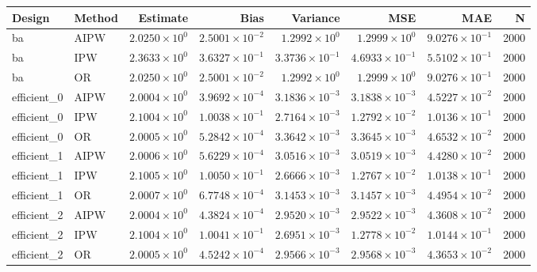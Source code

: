 \begin{table}[ht]
\centering
\begin{tabular}{llrrrrrr}
  \toprule
Design & Method & Estimate & Bias & Variance & MSE & MAE & N \\ 
  \midrule
ba & AIPW & $2.0250 \times 10^{0}$ & $2.5001 \times 10^{-2}$ & $1.2992 \times 10^{0}$ & $1.2999 \times 10^{0}$ & $9.0276 \times 10^{-1}$ & 2000 \\ 
  ba & IPW & $2.3633 \times 10^{0}$ & $3.6327 \times 10^{-1}$ & $3.3736 \times 10^{-1}$ & $4.6933 \times 10^{-1}$ & $5.5102 \times 10^{-1}$ & 2000 \\ 
  ba & OR & $2.0250 \times 10^{0}$ & $2.5001 \times 10^{-2}$ & $1.2992 \times 10^{0}$ & $1.2999 \times 10^{0}$ & $9.0276 \times 10^{-1}$ & 2000 \\ 
   \midrule
efficient\_0 & AIPW & $2.0004 \times 10^{0}$ & $3.9692 \times 10^{-4}$ & $3.1836 \times 10^{-3}$ & $3.1838 \times 10^{-3}$ & $4.5227 \times 10^{-2}$ & 2000 \\ 
  efficient\_0 & IPW & $2.1004 \times 10^{0}$ & $1.0038 \times 10^{-1}$ & $2.7164 \times 10^{-3}$ & $1.2792 \times 10^{-2}$ & $1.0136 \times 10^{-1}$ & 2000 \\ 
  efficient\_0 & OR & $2.0005 \times 10^{0}$ & $5.2842 \times 10^{-4}$ & $3.3642 \times 10^{-3}$ & $3.3645 \times 10^{-3}$ & $4.6532 \times 10^{-2}$ & 2000 \\ 
   \midrule
efficient\_1 & AIPW & $2.0006 \times 10^{0}$ & $5.6229 \times 10^{-4}$ & $3.0516 \times 10^{-3}$ & $3.0519 \times 10^{-3}$ & $4.4280 \times 10^{-2}$ & 2000 \\ 
  efficient\_1 & IPW & $2.1005 \times 10^{0}$ & $1.0050 \times 10^{-1}$ & $2.6666 \times 10^{-3}$ & $1.2767 \times 10^{-2}$ & $1.0138 \times 10^{-1}$ & 2000 \\ 
  efficient\_1 & OR & $2.0007 \times 10^{0}$ & $6.7748 \times 10^{-4}$ & $3.1453 \times 10^{-3}$ & $3.1457 \times 10^{-3}$ & $4.4954 \times 10^{-2}$ & 2000 \\ 
   \midrule
efficient\_2 & AIPW & $2.0004 \times 10^{0}$ & $4.3824 \times 10^{-4}$ & $2.9520 \times 10^{-3}$ & $2.9522 \times 10^{-3}$ & $4.3608 \times 10^{-2}$ & 2000 \\ 
  efficient\_2 & IPW & $2.1004 \times 10^{0}$ & $1.0041 \times 10^{-1}$ & $2.6951 \times 10^{-3}$ & $1.2778 \times 10^{-2}$ & $1.0144 \times 10^{-1}$ & 2000 \\ 
  efficient\_2 & OR & $2.0005 \times 10^{0}$ & $4.5242 \times 10^{-4}$ & $2.9566 \times 10^{-3}$ & $2.9568 \times 10^{-3}$ & $4.3653 \times 10^{-2}$ & 2000 \\ 

\end{tabular}
\end{table}
